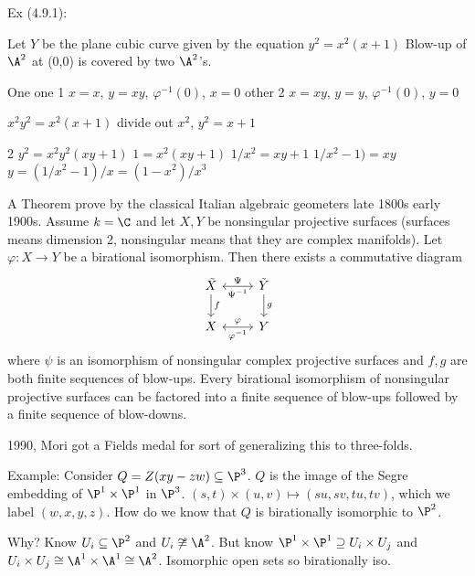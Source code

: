 Ex (4.9.1): 

Let $Y$ be the plane cubic curve given by the equation $y^2= x^2(x+1)$
Blow-up of $\A^2$ at (0,0) is covered by two $\A^2$'s.

One one 1 $x=x$, $y=xy$, $\varphi^{-1}(0)$, $x=0$
other 2 $x=xy$, $y=y$, $\varphi^{-1}(0)$, $y=0$

$x^2y^2=x^2(x+1)$ divide out $x^2$, $y^2=x+1$


2 $y^2= x^2y^2(xy+1)$
$1=x^2(xy+1)$
$1/x^2=xy+1$
$1/x^2-1)=xy$
$y= (1/x^2-1)/x= (1-x^2)/x^3$



A Theorem prove by the classical Italian algebraic geometers late 1800s early 1900s. Assume $k= \C$ and let $X,Y$ be nonsingular projective surfaces (surfaces means dimension 2, nonsingular means that they are complex manifolds). Let $\varphi: X \to Y$ be a birational isomorphism. Then there exists a commutative diagram
	\[
	\begin{tikzcd}
	\tilde{X} \arrow[leftrightarrow]{r}{\Psi}[swap]{\Psi^{-1}} \arrow{d}{f} & \tilde{Y} \arrow{d}{g} \\
	X \arrow[leftrightarrow]{r}{\varphi}[swap]{\varphi^{-1}} & Y
	\end{tikzcd}
	\]
where $\psi$ is an isomorphism of nonsingular complex projective surfaces and $f,g$ are both finite sequences of blow-ups. Every birational isomorphism of nonsingular projective surfaces can be factored into a finite sequence of blow-ups followed by a finite sequence of blow-downs. 


1990, Mori got a Fields medal for sort of generalizing this to three-folds. 


Example: Consider $Q= Z(xy-zw) \subseteq \P^3$. $Q$ is the image of the Segre embedding of $\P^1 \times \P^1$ in $\P^3$. $(s,t) \times (u,v) \mapsto (su,sv,tu,tv)$, which we label $(w,x,y,z)$. How do we know that $Q$ is birationally isomorphic to $\P^2$. 

Why? Know $U_i \subseteq \P^2$ and $U_i \not\cong \A^2$. But know $\P^1 \times \P^1 \supseteq U_i \times U_j$ and $U_i \times U_j \cong \A^1 \times \A^1 \cong \A^2$. Isomorphic open sets so birationally iso.

